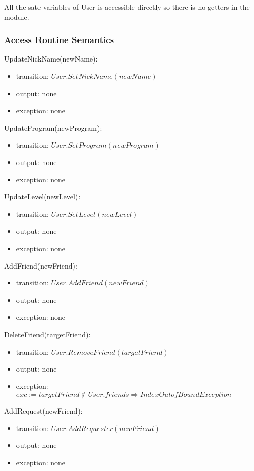 \documentclass[12pt, titlepage]{article}
\begin{document}
All the sate variables of User is accessible directly so there is no getters in the module.

\subsubsection{Access Routine Semantics}

\noindent UpdateNickName(newName):
\begin{itemize}
\item transition: $User.SetNickName(newName)$
\item output: none
\item exception: none
\end{itemize}

\noindent UpdateProgram(newProgram):
\begin{itemize}
\item transition: $User.SetProgram(newProgram)$
\item output: none
\item exception: none
\end{itemize}

\noindent UpdateLevel(newLevel):
\begin{itemize}
\item transition: $User.SetLevel(newLevel)$
\item output: none
\item exception: none
\end{itemize}

\noindent AddFriend(newFriend):
\begin{itemize}
\item transition: $User.AddFriend(newFriend)$ 
\item output: none
\item exception: none
\end{itemize}

\noindent DeleteFriend(targetFriend):
\begin{itemize}
\item transition: $User.RemoveFriend(targetFriend)$ 
\item output: none
\item exception: $exc := targetFriend \notin User.friends \Rightarrow IndexOutofBound Exception$
\end{itemize}

\noindent AddRequest(newFriend):
\begin{itemize}
\item transition: $User.AddRequester(newFriend)$ 
\item output: none
\item exception: none
\end{itemize}
\end{document}
